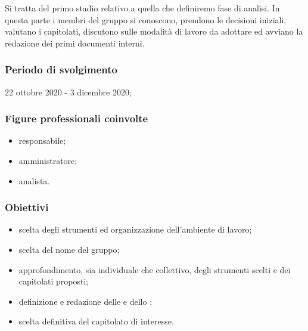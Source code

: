 Si tratta del primo stadio relativo a quella che definiremo fase di analisi. In questa parte i membri del gruppo si conoscono, prendono le decisioni iniziali, valutano i capitolati, discutono sulle modalità di lavoro da adottare ed avviano la redazione dei primi documenti interni.
        
        \subsubsection{Periodo di svolgimento}
        22 ottobre 2020 - 3 dicembre 2020;
        
        \subsubsection{Figure professionali coinvolte}
            \begin{itemize}
                \item responsabile;
                \item amministratore;
                \item analista.
            \end{itemize}
        
        \subsubsection{Obiettivi}
            \begin{itemize}
                \item scelta degli strumenti ed organizzazione dell'ambiente di lavoro;
                \item scelta del nome del gruppo;
                \item approfondimento, sia individuale che collettivo, degli strumenti scelti e dei capitolati proposti;
                \item definizione e redazione delle \NdP{} e dello \SdF{};
                \item scelta definitiva del capitolato di interesse.
            \end{itemize}
